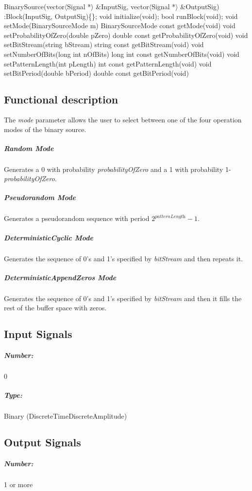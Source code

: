 BinarySource(vector$\langle$Signal *$\rangle$ \&InputSig, vector$\langle$Signal *$\rangle$ \&OutputSig) :Block(InputSig, OutputSig)\{\};
\bigbreak	
void initialize(void);
\bigbreak	
bool runBlock(void);
\bigbreak	
void setMode(BinarySourceMode m)
BinarySourceMode const getMode(void)
\bigbreak	
void setProbabilityOfZero(double pZero)
\bigbreak
double const getProbabilityOfZero(void)
\bigbreak	
void setBitStream(string bStream)
\bigbreak
string const getBitStream(void)
\bigbreak	
void setNumberOfBits(long int nOfBits)
\bigbreak
long int const getNumberOfBits(void)
\bigbreak	
void setPatternLength(int pLength)
\bigbreak
int const getPatternLength(void)
\bigbreak	
void setBitPeriod(double bPeriod)
\bigbreak
double const getBitPeriod(void)

\subsection*{Functional description}

The \textit{mode} parameter allows the user to select between one of the four operation modes of the binary source.

\subparagraph*{Random Mode}
Generates a 0 with probability \textit{probabilityOfZero} and a 1 with probability 1-\textit{probabilityOfZero}.

\subparagraph*{Pseudorandom Mode}
Generates a pseudorandom sequence with period $2^\textit{patternLength}-1$.

\subparagraph*{DeterministicCyclic Mode}
Generates the sequence of 0's and 1's specified by \textit{bitStream} and then repeats it.

\subparagraph*{DeterministicAppendZeros Mode}
Generates the sequence of 0's and 1's specified by \textit{bitStream} and then it fills the rest of the buffer space with zeros.

\subsection*{Input Signals}


\subparagraph*{Number:} 0

\subparagraph*{Type:} Binary (DiscreteTimeDiscreteAmplitude)

\subsection*{Output Signals}

\subparagraph*{Number:} 1 or more

